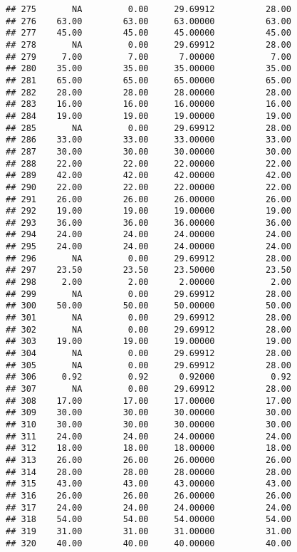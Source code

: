 \documentclass[
]{article}
\begin{document}
\begin{verbatim}
## 275       NA         0.00     29.69912          28.00
## 276    63.00        63.00     63.00000          63.00
## 277    45.00        45.00     45.00000          45.00
## 278       NA         0.00     29.69912          28.00
## 279     7.00         7.00      7.00000           7.00
## 280    35.00        35.00     35.00000          35.00
## 281    65.00        65.00     65.00000          65.00
## 282    28.00        28.00     28.00000          28.00
## 283    16.00        16.00     16.00000          16.00
## 284    19.00        19.00     19.00000          19.00
## 285       NA         0.00     29.69912          28.00
## 286    33.00        33.00     33.00000          33.00
## 287    30.00        30.00     30.00000          30.00
## 288    22.00        22.00     22.00000          22.00
## 289    42.00        42.00     42.00000          42.00
## 290    22.00        22.00     22.00000          22.00
## 291    26.00        26.00     26.00000          26.00
## 292    19.00        19.00     19.00000          19.00
## 293    36.00        36.00     36.00000          36.00
## 294    24.00        24.00     24.00000          24.00
## 295    24.00        24.00     24.00000          24.00
## 296       NA         0.00     29.69912          28.00
## 297    23.50        23.50     23.50000          23.50
## 298     2.00         2.00      2.00000           2.00
## 299       NA         0.00     29.69912          28.00
## 300    50.00        50.00     50.00000          50.00
## 301       NA         0.00     29.69912          28.00
## 302       NA         0.00     29.69912          28.00
## 303    19.00        19.00     19.00000          19.00
## 304       NA         0.00     29.69912          28.00
## 305       NA         0.00     29.69912          28.00
## 306     0.92         0.92      0.92000           0.92
## 307       NA         0.00     29.69912          28.00
## 308    17.00        17.00     17.00000          17.00
## 309    30.00        30.00     30.00000          30.00
## 310    30.00        30.00     30.00000          30.00
## 311    24.00        24.00     24.00000          24.00
## 312    18.00        18.00     18.00000          18.00
## 313    26.00        26.00     26.00000          26.00
## 314    28.00        28.00     28.00000          28.00
## 315    43.00        43.00     43.00000          43.00
## 316    26.00        26.00     26.00000          26.00
## 317    24.00        24.00     24.00000          24.00
## 318    54.00        54.00     54.00000          54.00
## 319    31.00        31.00     31.00000          31.00
## 320    40.00        40.00     40.00000          40.00

\end{verbatim}
\end{document}
